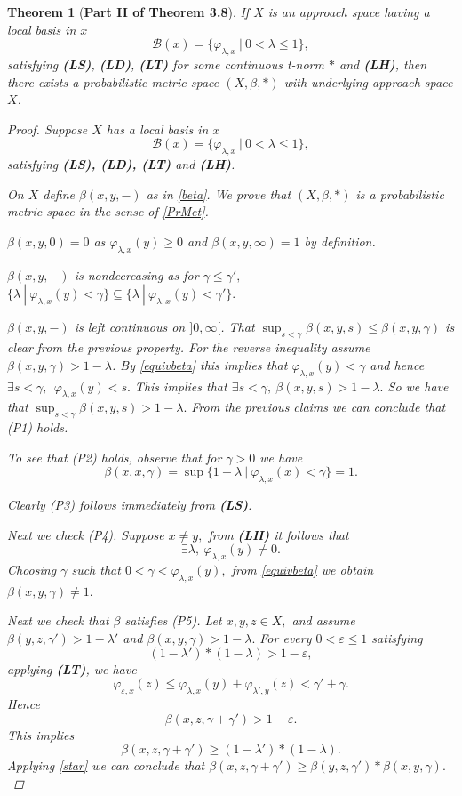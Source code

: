 \documentclass[10pt,a4paper]{amsart}
\newtheorem{theorem}{Theorem}
\renewcommand{\b}{\ensuremath{\beta}}
\newcommand{\bbb}{\ensuremath{\mathcal{B}}}
\renewcommand{\l}{\ensuremath{\lambda}}
\newcommand{\ve}{\ensuremath{\varepsilon}}
\begin{document}
\begin{theorem} [\bf Part II of Theorem 3.8]\label{pmetr}
If $X$ is an approach space having a local basis in $x$
$$
\bbb(x) = \{ \varphi_{\l,x} \ | \ 0  < \l \leq 1 \},
$$
satisfying {\bf(LS)}, {\bf(LD)}, {\bf(LT)} for some continuous t-norm $*$ and {\bf(LH)}, then there exists a probabilistic metric space $(X,\b,*)$ with underlying approach space $X$.

\begin{proof}
Suppose 
$X$ has a local basis in $x$ 
$$
\bbb(x) = \{ \varphi_{\l,x} \ | \ 0  < \l \leq 1 \},
$$
satisfying {\bf(LS), (LD), (LT)} and {\bf(LH)}.

On $X$ define $\b(x,y, -)$ as in \eqref{beta}.
We prove that $(X, \b, *) $ is a probabilistic metric space in the sense of \eqref{PrMet}.

$\b(x,y,0) =0$ as $\varphi_{\l,x} (y) \geq 0$ and $\b(x,y,\infty) =1$ by definition.

$\b(x,y,-)$ is nondecreasing as for $\gamma \leq \gamma',$  $\{ \l \ | \ \varphi_{\l,x} (y) < \gamma\} \subseteq \{ \l \ | \ \varphi_{\l,x} (y) < \gamma'\}.$


$\b(x,y,-)$ is left continuous on $]0, \infty[$. That $\sup_{s < \gamma} \b(x,y,s) \leq  \b(x,y,\gamma)$ is clear from the previous property. For the reverse inequality assume $\b(x,y,\gamma) > 1 - \l$. By \ref{equivbeta} this implies that $\varphi _{ \l,x} (y) < \gamma$  and hence $\exists s < \gamma,  \ \ \varphi _{ \l,x} (y) < s.$ This implies that $\exists s <\gamma,  \  \b(x,y,s) > 1 - \l.$ So we have that $\sup_{s < \gamma} \b(x,y,s) > 1 - \l.$
From the previous claims we can conclude that (P1) holds.

To see that (P2) holds,  observe that for $\gamma >0$  we have\\
 $$\b(x,x,\gamma) = \sup \{1 - \l \ | \ \varphi_{\l,x} (x) < \gamma\}  = 1.$$

Clearly (P3) follows immediately from {\bf(LS)}.

Next we check (P4). Suppose $x \not = y,$  from {\bf (LH)} it follows that $$\exists \l, \ \varphi_{\l,x} (y) \not = 0.$$
Choosing $\gamma$ such that $0 < \gamma < \varphi_{\l,x} (y), $ from \ref{equivbeta} we obtain $\b(x,y,\gamma) \not = 1.$

Next we check that $\b$ satisfies (P5). Let $x,y,z \in X,$ and assume $\b(y,z,\gamma') > 1 - \l'$ and $\b(x,y,\gamma) > 1 - \l.$  
For every $ 0 < \ve \leq 1 $ satisfying 
$$
(1 - \l') * ( 1 - \l) > 1-\ve,
$$
applying {\bf(LT)},  
we have
$$
\varphi_{\ve,x} (z) \leq \varphi _{\l, x} (y) + \varphi _{\l', y} (z) < \gamma' + \gamma.
$$
Hence
$$
\b(x,z, \gamma + \gamma') > 1 - \ve. 
$$
This implies
$$
\b(x,z, \gamma + \gamma') \geq  (1 - \l') * ( 1 - \l).
$$
Applying \ref{star}
we can conclude that $\b(x,z, \gamma + \gamma') \geq \b(y,z, \gamma')  * \b(x,y, \gamma). $\\


\end{proof}
\end{theorem}
\end{document}
